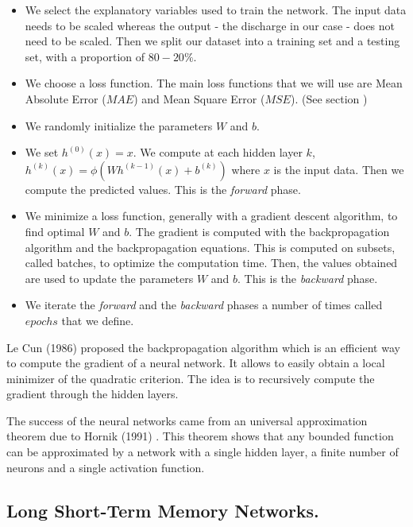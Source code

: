 \begin{itemize}
    \item We select the explanatory variables used to train the network. The input data needs to be scaled whereas the output - the discharge in our case - does not need to be scaled. Then we split our dataset into a training set and a testing set, with a proportion of $80-20\%$.
    \item We choose a loss function. The main loss functions that we will use are Mean Absolute Error ($MAE$) and Mean Square Error ($MSE$). (See section )
    \item We randomly initialize the parameters $W$ and $b$. 
    \item We set $h^{(0)}(x) = x$. We compute at each hidden layer $k$, $h^{(k)}(x) = \phi (Wh^{(k-1)}(x)+b^{(k)})$ where $x$ is the input data. Then we compute the predicted values. This is the \textit{forward} phase. 
    \item We minimize a loss function, generally with a gradient descent algorithm, to find optimal $W$ and $b$. The gradient is computed with the backpropagation algorithm and the backpropagation equations. This is computed on subsets, called batches,  to optimize the computation time. Then, the values obtained are used to update the parameters $W$ and $b$. This is the \textit{backward} phase. 
    \item We iterate the \textit{forward} and the \textit{backward} phases a number of times called $epochs$ that we define.\newline
\end{itemize}

Le Cun (1986) \cite{lecun1989backpropagation} proposed the backpropagation algorithm which is an efficient way to compute the gradient of a neural network. It allows to easily obtain a local minimizer of the quadratic criterion. The idea is to recursively compute the gradient through the hidden layers. 

The success of the neural networks came from an universal approximation theorem due to Hornik (1991) \cite{hornik1991approximation}. This theorem shows that any bounded function can be approximated by a network with a single hidden layer, a finite number of neurons and a single activation function. 


\subsection{Long Short-Term Memory Networks.}

